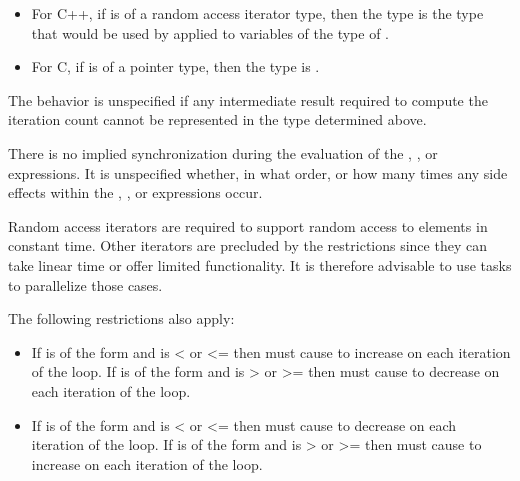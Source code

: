\begin{ccppspecific}
\begin{itemize}
    \item For C++, if  is of a random access iterator type, then the type is the type that
    would be used by  applied to variables of the type of .

    \item For C, if  is of a pointer type, then the type is .
\end{itemize}

The behavior is unspecified if any intermediate result required to compute the iteration
count cannot be represented in the type determined above.

There is no implied synchronization during the evaluation of the , , or 
expressions. It is unspecified whether, in what order, or how many times any side effects
within the , , or  expressions occur.

\begin{note}
Random access iterators are required to support random access to elements in
constant time. Other iterators are precluded by the restrictions since they can take linear
time or offer limited functionality. It is therefore advisable to use tasks to parallelize
those cases.


\end{note}

\restrictions
The following restrictions also apply:

\begin{itemize}
    \item If  is of the form  
     and  is < or <= then  must cause  to increase on each
    iteration of the loop. If  is of
    the form    and 
    is > or >= then  must cause  to decrease on each iteration of the loop.

    \item If  is of the form  
     and  is < or <= then
     must cause  to decrease on each iteration of the loop. If  is of
    the form    and 
    is > or >= then  must cause  to increase on each iteration of the loop.


\end{itemize}
\end{ccppspecific}
